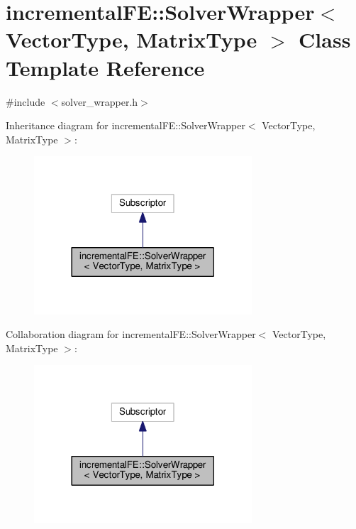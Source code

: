 \hypertarget{classincremental_f_e_1_1_solver_wrapper}{}\section{incremental\+FE\+:\+:Solver\+Wrapper$<$ Vector\+Type, Matrix\+Type $>$ Class Template Reference}
\label{classincremental_f_e_1_1_solver_wrapper}


{\ttfamily \#include $<$solver\+\_\+wrapper.\+h$>$}



Inheritance diagram for incremental\+FE\+:\+:Solver\+Wrapper$<$ Vector\+Type, Matrix\+Type $>$\+:\nopagebreak
\begin{figure}[H]
\begin{center}
\leavevmode
\includegraphics[width=230pt]{classincremental_f_e_1_1_solver_wrapper__inherit__graph}
\end{center}
\end{figure}


Collaboration diagram for incremental\+FE\+:\+:Solver\+Wrapper$<$ Vector\+Type, Matrix\+Type $>$\+:\nopagebreak
\begin{figure}[H]
\begin{center}
\leavevmode
\includegraphics[width=230pt]{classincremental_f_e_1_1_solver_wrapper__coll__graph}
\end{center}
\end{figure}
